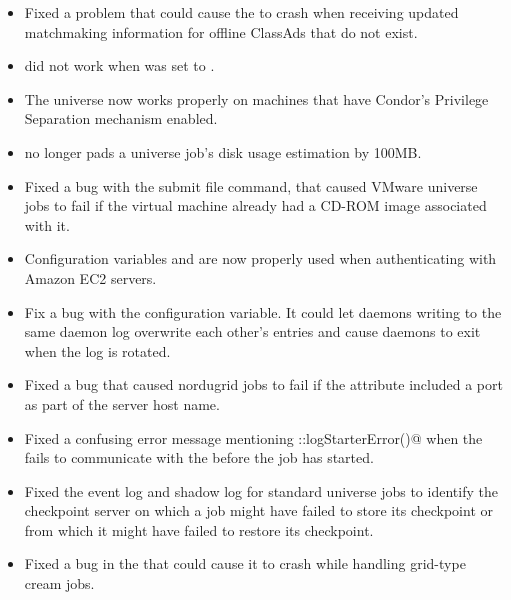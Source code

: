\begin{itemize}
\item Fixed a problem that could cause the  to crash
when receiving updated matchmaking information for offline ClassAds that do
not exist.

\item {} did not work when
 was set to .

\item The  universe now works properly on machines that 
have Condor's Privilege Separation mechanism enabled.

\item {} no longer pads a  universe job's disk usage
estimation by 100MB.

\item Fixed a bug with the  submit file
command, that caused VMware  universe jobs to fail if the virtual
machine already had a CD-ROM image associated with it.

\item Configuration variables  and
 are now properly used when authenticating
with Amazon EC2 servers.

\item Fix a bug with the  configuration variable.
It could let daemons writing to the same daemon log overwrite each other's
entries and cause daemons to exit when the log is rotated.

\item Fixed a bug that caused nordugrid jobs to fail if the
 attribute included a port as part of the server
host name.

\item Fixed a confusing error message mentioning
  \verb@LocalUserLog::logStarterError()@ when the  fails to
  communicate with the  before the job has started.

\item Fixed the event log and shadow log for standard universe jobs to 
identify the checkpoint server on which a job might have failed to store 
its checkpoint or from which it might have failed to restore its checkpoint.

\item Fixed a bug in the  that could cause it to crash
while handling grid-type cream jobs.


\end{itemize}
